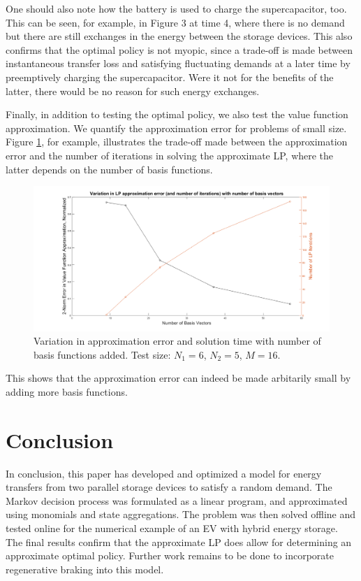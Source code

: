 \documentclass[conference]{IEEEtran}
\begin{document}
One should also note how the battery is used to charge the supercapacitor, too. This can be seen, for example, in Figure 3 at time 4, where there is no demand but there are still exchanges in the energy between the storage devices. This also confirms that the optimal policy is not myopic, since a trade-off is made between instantaneous transfer loss and satisfying fluctuating demands at a later time by preemptively charging the supercapacitor. Were it not for the benefits of the latter, there would be no reason for such energy exchanges.

Finally, in addition to testing the optimal policy, we also test the value function approximation. We quantify the approximation error for problems of small size. Figure \ref{fig:ApproxVsIter}, for example, illustrates the trade-off made between the approximation error and the number of iterations in solving the approximate LP, where the latter depends on the number of basis functions. \begin{figure}[tbp]
\centerline{\includegraphics[scale=0.25]{ApproxErr_vs_NumIter.png}}
\caption{Variation in approximation error and solution time with number of basis functions added. Test size: $N_{1}=6$, $N_{2}=5$, $M=16$.}
\label{fig:ApproxVsIter}
\end{figure} This shows that the approximation error can indeed be made arbitarily small by adding more basis functions. %



\section{Conclusion}
In conclusion, this paper has developed and optimized a model for energy transfers from two parallel storage devices to satisfy a random demand. The Markov decision process was formulated as a linear program, and approximated using monomials and state aggregations. The problem was then solved offline and tested online for the numerical example of an EV with hybrid energy storage. The final results confirm that the approximate LP does allow for determining an approximate optimal policy. Further work remains to be done to incorporate regenerative braking into this model.



\end{document}
